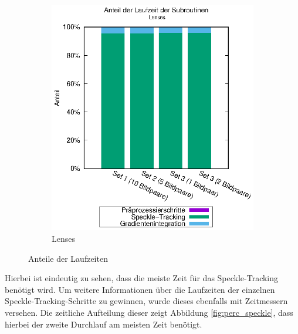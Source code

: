 \begin{center}
\begin{figure}[htbp]
\begin{subfigure}[b]{0.5\textwidth}
			\includegraphics[width=\textwidth]{pdf/main_lenses}
			\caption{Lenses}
			\label{fig:perc_main_lenses}
		\end{subfigure}
		\caption{Anteile der Laufzeiten}
		\label{fig:perc_main}
	\end{figure}
\end{center}

Hierbei ist eindeutig zu sehen, dass die meiste Zeit für das Speckle-Tracking benötigt wird. Um weitere Informationen über die Laufzeiten der einzelnen Speckle-Tracking-Schritte zu gewinnen, wurde dieses ebenfalls mit Zeitmessern versehen. Die zeitliche Aufteilung dieser zeigt Abbildung \ref{fig:perc_speckle}, dass hierbei der zweite Durchlauf am meisten Zeit benötigt. 


